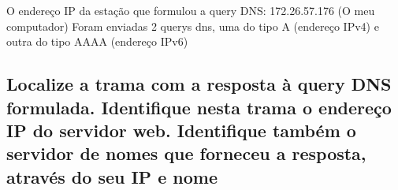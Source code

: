 \documentclass{article}
\begin{document}
O endereço IP da estação que formulou a query DNS: 172.26.57.176 (O meu computador)
Foram enviadas 2 querys dns, uma do tipo A (endereço IPv4) e outra do tipo AAAA (endereço IPv6)

\subsection{Localize a trama com a resposta à query DNS formulada. Identifique nesta trama o endereço IP do
servidor web. Identifique também o servidor de nomes que forneceu a resposta, através do seu IP e nome}
\end{document}
